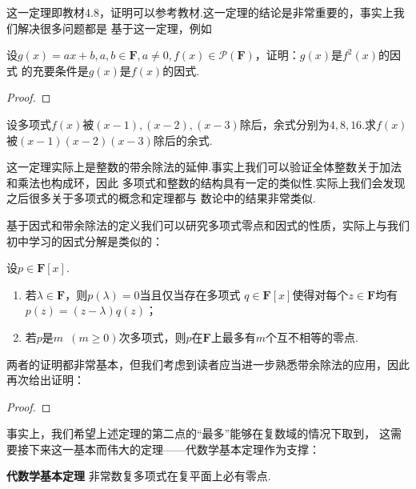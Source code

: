 这一定理即教材4.8，证明可以参考教材.这一定理的结论是非常重要的，事实上我们解决很多问题都是
基于这一定理，例如
\begin{example}
    设$g(x)=ax+b,a,b\in\mathbf{F},a\neq 0,
	f(x)\in \mathcal{P}(\mathbf{F})$，证明：$g(x)$是$f^2(x)$的因式
	的充要条件是$g(x)$是$f(x)$的因式.
\end{example}
\begin{proof}
    
\end{proof}

\begin{example}
    设多项式$f(x)$被$(x-1),(x-2),(x-3)$除后，余式分别为$4,8,16$.求$f(x)$被$(x-1)(x-2)(x-3)$除后的余式.
\end{example}
\begin{solution}

\end{solution}

这一定理实际上是整数的带余除法的延伸.事实上我们可以验证全体整数关于加法和乘法也构成环，因此
多项式和整数的结构具有一定的类似性.实际上我们会发现之后很多关于多项式的概念和定理都与
数论中的结果非常类似.

基于因式和带余除法的定义我们可以研究多项式零点和因式的性质，实际上与我们初中学习的因式分解是类似的：
\begin{theorem}
    设$p\in\mathbf{F}[x]$.
    \begin{enumerate}
        \item 若$\lambda\in\mathbf{F}$，则$p(\lambda)=0$当且仅当存在多项式
            $q\in\mathbf{F}[x]$使得对每个$z\in\mathbf{F}$均有$p(z)=(z-\lambda)q(z)$；

        \item 若$p$是$m\enspace(m \geqslant 0)$次多项式，则$p$在$\mathbf{F}$上最多有$m$个互不相等的零点.
    \end{enumerate}
\end{theorem}
两者的证明都非常基本，但我们考虑到读者应当进一步熟悉带余除法的应用，因此再次给出证明：
\begin{proof}
    
\end{proof}

事实上，我们希望上述定理的第二点的``最多''能够在复数域的情况下取到，
这需要接下来这一基本而伟大的定理——代数学基本定理作为支撑：
\begin{theorem} \textbf{\heiti 代数学基本定理} \label{thm:14:代数学基本定理}
    非常数复多项式在复平面上必有零点.
\end{theorem}


